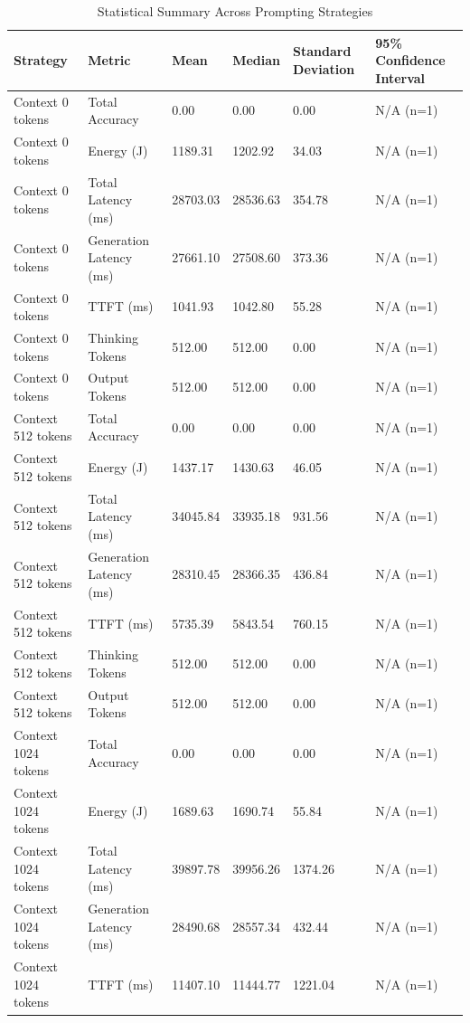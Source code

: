 \begin{table}
\caption{Statistical Summary Across Prompting Strategies}
\label{tab:statistical_summary}
\begin{tabular}{llllll}
\toprule
Strategy & Metric & Mean & Median & Standard Deviation & 95\% Confidence Interval \\
\midrule
Context 0 tokens & Total Accuracy & 0.00 & 0.00 & 0.00 & N/A (n=1) \\
Context 0 tokens & Energy (J) & 1189.31 & 1202.92 & 34.03 & N/A (n=1) \\
Context 0 tokens & Total Latency (ms) & 28703.03 & 28536.63 & 354.78 & N/A (n=1) \\
Context 0 tokens & Generation Latency (ms) & 27661.10 & 27508.60 & 373.36 & N/A (n=1) \\
Context 0 tokens & TTFT (ms) & 1041.93 & 1042.80 & 55.28 & N/A (n=1) \\
Context 0 tokens & Thinking Tokens & 512.00 & 512.00 & 0.00 & N/A (n=1) \\
Context 0 tokens & Output Tokens & 512.00 & 512.00 & 0.00 & N/A (n=1) \\
Context 512 tokens & Total Accuracy & 0.00 & 0.00 & 0.00 & N/A (n=1) \\
Context 512 tokens & Energy (J) & 1437.17 & 1430.63 & 46.05 & N/A (n=1) \\
Context 512 tokens & Total Latency (ms) & 34045.84 & 33935.18 & 931.56 & N/A (n=1) \\
Context 512 tokens & Generation Latency (ms) & 28310.45 & 28366.35 & 436.84 & N/A (n=1) \\
Context 512 tokens & TTFT (ms) & 5735.39 & 5843.54 & 760.15 & N/A (n=1) \\
Context 512 tokens & Thinking Tokens & 512.00 & 512.00 & 0.00 & N/A (n=1) \\
Context 512 tokens & Output Tokens & 512.00 & 512.00 & 0.00 & N/A (n=1) \\
Context 1024 tokens & Total Accuracy & 0.00 & 0.00 & 0.00 & N/A (n=1) \\
Context 1024 tokens & Energy (J) & 1689.63 & 1690.74 & 55.84 & N/A (n=1) \\
Context 1024 tokens & Total Latency (ms) & 39897.78 & 39956.26 & 1374.26 & N/A (n=1) \\
Context 1024 tokens & Generation Latency (ms) & 28490.68 & 28557.34 & 432.44 & N/A (n=1) \\
Context 1024 tokens & TTFT (ms) & 11407.10 & 11444.77 & 1221.04 & N/A (n=1) \\

\end{tabular}
\end{table}
